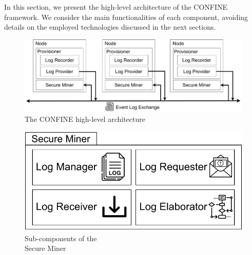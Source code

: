 
In this section, we present the high-level architecture of the CONFINE framework. We consider the main functionalities of each component, avoiding details on the employed technologies discussed in the next sections. %
\begin{figure}[t]
	\centering
	\includegraphics[width=0.79\linewidth]{content/figures/architecturediagram.pdf}
	\caption{The CONFINE high-level architecture}
	\label{fig:architecture_diagram}
\end{figure}

\begin{figure}
	\vspace{-2em}
	\centering
	\includegraphics[width=1\textwidth]{content/figures/secureminersad.pdf}
	\caption[Secure Miner sub-components]{Sub-components of the \\Secure Miner}
	\label{fig:trusted_miner}
	\vspace{-6pt}
\end{figure} 

